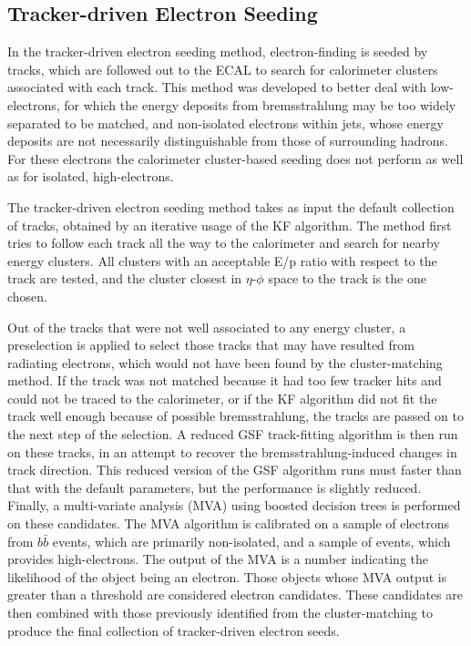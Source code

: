 \subsection{Tracker-driven Electron Seeding}
\label{evReco:trkDrv}
In the tracker-driven electron seeding method, 
electron-finding is seeded by tracks, 
which are followed out to the 
ECAL to search for calorimeter clusters 
associated with each track.  
This method was developed to better deal with 
low-\pT electrons, for which the energy deposits 
from bremsstrahlung may be too widely separated 
to be matched,  
and non-isolated electrons within jets, 
whose energy deposits are not necessarily 
distinguishable from those of surrounding hadrons.  
For these electrons the calorimeter cluster-based 
seeding does not perform as well as for 
isolated, high-\pT electrons.  

The tracker-driven electron seeding method 
takes as input the default collection 
of tracks, obtained by an iterative usage 
of the KF algorithm.  
The method first tries to follow each track 
all the way to the calorimeter and search 
for nearby energy clusters.  
All clusters with an acceptable E/p ratio 
with respect to the track are tested, 
and the cluster closest in $\eta$-$\phi$ 
space to the track is the one chosen. 
 
Out of the tracks that were not 
well associated to any energy cluster, 
a preselection is applied to select 
those tracks that may have resulted from 
radiating electrons, 
which would not have been found 
by the cluster-matching method.  
If the track was not matched because it had 
too few tracker hits and could not be traced 
to the calorimeter, 
or if the KF algorithm did not fit the 
track well enough because of possible 
bremsstrahlung, the tracks are passed 
on to the next step of the selection.  
A reduced GSF track-fitting algorithm 
is then run on these tracks, 
in an attempt to recover the 
bremsstrahlung-induced changes in track direction. 
This reduced version of the GSF algorithm runs 
must faster than that with the default parameters, 
but the performance is slightly reduced.  
Finally, a multi-variate analysis (MVA) using 
boosted decision trees 
is performed on these candidates.  
The MVA algorithm is 
calibrated 
on a sample of electrons from 
$b \bar{b}$ events, which are primarily non-isolated, 
and a sample of \Zee events, 
which provides high-\pT electrons.  
The output of the MVA is a number indicating 
the likelihood of the object being an electron.   
Those objects whose MVA output is greater than a threshold 
are considered electron candidates. 
These candidates are then combined with those 
previously identified from the cluster-matching 
to produce the final collection of 
tracker-driven electron seeds.  

